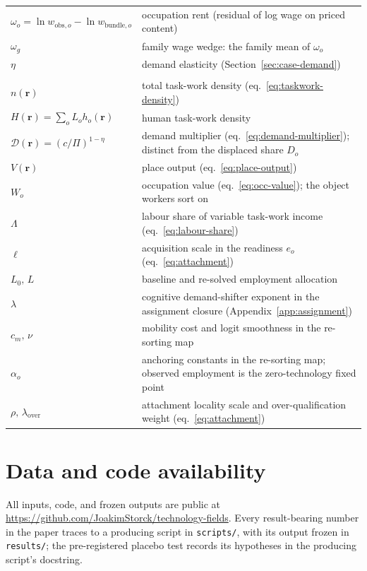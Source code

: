\documentclass[12pt, a4paper]{article}
\begin{document}
\begin{longtable}{@{}l >{\raggedright\arraybackslash}p{}@{}}
$\omega_o=\ln w_{\mathrm{obs},o}-\ln w_{\mathrm{bundle},o}$ & occupation rent (residual of log wage on priced content) \\
$\omega_g$ & family wage wedge: the family mean of $\omega_o$ \\
$\eta$ & demand elasticity (Section~\ref{sec:case-demand}) \\
\addlinespace
\multicolumn{2}{@{}l}{\textit{Equilibrium and mobility}} \\
\addlinespace
$n(\mathbf{r})$ & total task-work density (eq.~\eqref{eq:taskwork-density}) \\
$H(\mathbf{r})=\sum_o L_o h_o(\mathbf{r})$ & human task-work density \\
$\mathcal{D}(\mathbf{r})=(c/\Pi)^{1-\eta}$ & demand multiplier (eq.~\eqref{eq:demand-multiplier}); distinct from the displaced share $D_o$ \\
$V(\mathbf{r})$ & place output (eq.~\eqref{eq:place-output}) \\
$W_o$ & occupation value (eq.~\eqref{eq:occ-value}); the object workers sort on \\
$\Lambda$ & labour share of variable task-work income (eq.~\eqref{eq:labour-share}) \\
$\ell$ & acquisition scale in the readiness $e_o$ (eq.~\eqref{eq:attachment}) \\
$L_0,\,L$ & baseline and re-solved employment allocation \\
$\lambda$ & cognitive demand-shifter exponent in the assignment closure (Appendix~\ref{app:assignment}) \\
$c_m,\,\nu$ & mobility cost and logit smoothness in the re-sorting map \\
$\alpha_o$ & anchoring constants in the re-sorting map; observed employment is the zero-technology fixed point \\
$\rho,\,\lambda_{\mathrm{over}}$ & attachment locality scale and over-qualification weight (eq.~\eqref{eq:attachment}) \\
\end{longtable}

\section*{Data and code availability}

All inputs, code, and frozen outputs are public at
\url{https://github.com/JoakimStorck/technology-fields}. Every
result-bearing number in the paper traces to a producing script in
\texttt{scripts/}, with its output frozen in \texttt{results/}; the
pre-registered placebo test records its hypotheses in the producing
script's docstring.
\end{document}
